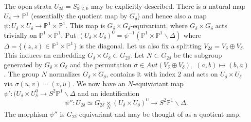 \documentclass[a4paper,10pt]{amsart}
\numberwithin{equation}{section}
\begin{document}
The open strata $U_{2\delta}=S_{0,2,0}^{\circ}$ may be explicitly described. There is a natural map $U_{\delta} \to \mathbb{P}^1$ (essentially the quotient map by $G_{\delta}$) and hence also a map $\psi: U_{\delta} \times U_{\delta} \to \mathbb{P}^1 \times \mathbb{P}^1$. This map is $G_{\delta} \times G_{\delta}$-equivariant, where $G_{\delta} \times G_{\delta}$ acts trivially on $\mathbb{P}^1 \times \mathbb{P}^1$. Put $(U_{\delta} \times U_{\delta})^0=\psi^{-1} (\mathbb{P}^1 \times \mathbb{P}^1 \backslash \Delta)$ where $\Delta =\{ (z,z)\in \mathbb{P}^1 \times \mathbb{P}^1\}$ is the diagonal. Let us also fix a splitting $V_{2\delta} =V_{\delta} \oplus V_{\delta}$. This induces an embedding $G_{\delta} \times G_{\delta}\subset G_{2\delta}$. Let $N \subset G_{2\delta}$ be the subgroup generated by $G_{\delta} \times G_{\delta}$ and the permutation $\sigma \in Aut(V_{\delta} \oplus V_{\delta}),\; (a,b) \mapsto (b,a)$. The group $N$ normalizes $G_{\delta} \times G_{\delta}$, contains it with index $2$ and acts on $U_{\delta} \times U_{\delta}$ via $\sigma (u,v)=(v,u)$. We now have an $N$-equivariant map $\psi': (U_{\delta} \times U_{\delta}^0 \to S^2 \mathbb{P}^1 \backslash \Delta$ and an identification
$$\psi'': U_{2\delta} \simeq G_{2\delta}\underset{N}{\times} (U_{\delta} \times U_\delta)^0 \to S^2 \mathbb{P}^1\backslash \Delta.$$
The morphism $\psi''$ is $G_{2\delta}$-equivariant and may be thought of as a quotient map.

\vspace{.1in}
\end{document}

